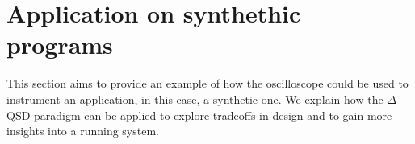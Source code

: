\chapter{Application on synthethic programs}
    This section aims to provide an example of how the oscilloscope could be used to instrument an application, in this case, a synthetic one. We explain how the $\Delta$QSD paradigm can be applied to explore tradeoffs in design and to gain more insights into a running system.

